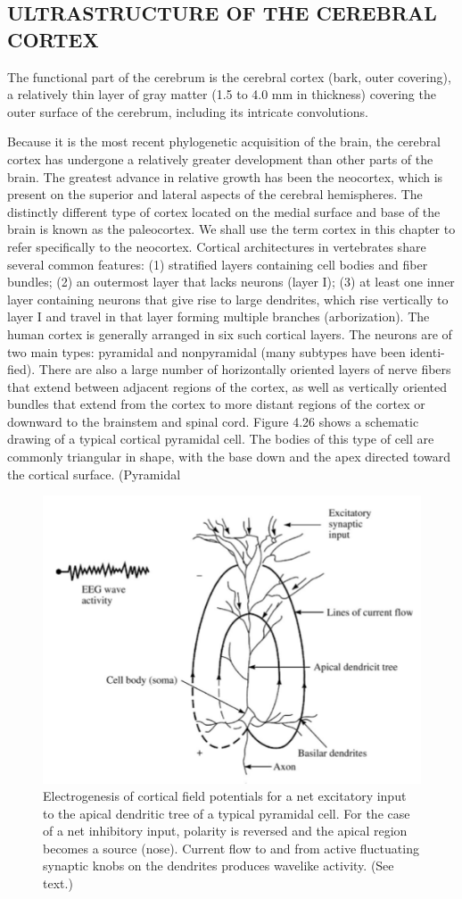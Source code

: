 \subsection{ULTRASTRUCTURE OF THE CEREBRAL CORTEX}

The functional part of the cerebrum is the cerebral cortex (bark, outer
covering), a relatively thin layer of gray matter (1.5 to 4.0 mm in thickness)
covering the outer surface of the cerebrum, including its intricate convolutions.

Because it is the most recent phylogenetic acquisition of the brain, the cerebral
cortex has undergone a relatively greater development than other parts of the
brain. The greatest advance in relative growth has been the neocortex, which is
present on the superior and lateral aspects of the cerebral hemispheres. The
distinctly different type of cortex located on the medial surface and base of the
brain is known as the paleocortex. We shall use the term cortex in this chapter
to refer specifically to the neocortex.
Cortical architectures in vertebrates share several common features:
(1) stratified layers containing cell bodies and fiber bundles; (2) an outermost
layer that lacks neurons (layer I); (3) at least one inner layer containing
neurons that give rise to large dendrites, which rise vertically to layer I and
travel in that layer forming multiple branches (arborization). The human
cortex is generally arranged in six such cortical layers. The neurons are of two
main types: pyramidal and nonpyramidal (many subtypes have been identi-
fied). There are also a large number of horizontally oriented layers of nerve
fibers that extend between adjacent regions of the cortex, as well as vertically
oriented bundles that extend from the cortex to more distant regions of the
cortex or downward to the brainstem and spinal cord.
Figure 4.26 shows a schematic drawing of a typical cortical pyramidal
cell. The bodies of this type of cell are commonly triangular in shape, with
the base down and the apex directed toward the cortical surface. (Pyramidal

\begin{figure}
\centering
\includegraphics[width=0.7\linewidth]{figura_3.png} 
\caption{Electrogenesis of cortical field potentials for a net excitatory
input to the apical dendritic tree of a typical pyramidal cell. For the case of a
net inhibitory input, polarity is reversed and the apical region becomes a
source (nose). Current flow to and from active fluctuating synaptic knobs on the
dendrites produces wavelike activity. (See text.)}
\end{figure}

